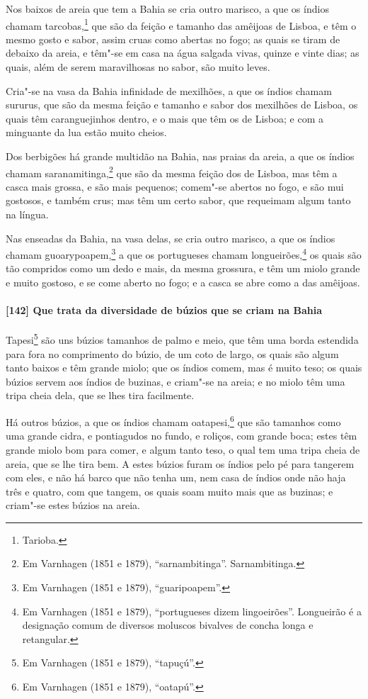 Nos baixos de areia que tem a Bahia se cria outro marisco, a que os índios chamam
tarcobas,\footnote{ Tarioba.} que são da feição e tamanho das amêijoas de Lisboa, e têm o
mesmo gosto e sabor, assim cruas como abertas no fogo; as quais se tiram de debaixo da
areia, e têm"-se em casa na água salgada vivas, quinze e vinte dias; as quais, além de
serem maravilhosas no sabor, são muito leves.

Cria"-se na vasa da Bahia infinidade de mexilhões, a que os índios chamam sururus, que são
da mesma feição e tamanho e sabor dos mexilhões de Lisboa, os quais têm caranguejinhos
dentro, e o mais que têm os de Lisboa; e com a minguante da lua estão muito cheios.

Dos berbigões há grande multidão na Bahia, nas praias da areia, a que os índios chamam
saranamitinga,\footnote{ Em Varnhagen (1851 e 1879), ``sarnambitinga''. Sarnambitinga.}
que são da mesma feição dos de Lisboa, mas têm a casca mais grossa, e são mais pequenos;
comem"-se abertos no fogo, e são mui gostosos, e também crus; mas têm um certo sabor, que
requeimam algum tanto na língua.

Nas enseadas da Bahia, na vasa delas, se cria outro marisco, a que os índios chamam
guoarypoapem,\footnote{ Em Varnhagen (1851 e 1879), ``guaripoapem''.} a que os portugueses
chamam longueirões,\footnote{ Em Varnhagen (1851 e 1879), ``portugueses dizem
lingoeirões''. Longueirão é a designação comum de diversos moluscos bivalves de concha
longa e retangular.} os quais são tão compridos como um dedo e mais, da mesma grossura, e
têm um miolo grande e muito gostoso, e se come aberto no fogo; e a casca se abre como a
das amêijoas.

\paragraph{[142] Que trata da diversidade de búzios que se criam na Bahia}\quad
Tapesi\footnote{ Em Varnhagen (1851 e 1879), ``tapuçú''.} são uns búzios tamanhos de palmo
e meio, que têm uma borda estendida para fora no comprimento do búzio, de um coto de
largo, os quais são algum tanto baixos e têm grande miolo; que os índios comem, mas é
muito teso; os quais búzios servem aos índios de buzinas, e criam"-se na areia; e no miolo
têm uma tripa cheia dela, que se lhes tira facilmente.

Há outros búzios, a que os índios chamam oatapesi,\footnote{ Em Varnhagen (1851 e 1879),
``oatapú''.} que são tamanhos como uma grande cidra, e pontiagudos no fundo, e roliços,
com grande boca; estes têm grande miolo bom para comer, e algum tanto teso, o qual tem uma
tripa cheia de areia, que se lhe tira bem. A estes búzios furam os índios pelo pé para
tangerem com eles, e não há barco que não tenha um, nem casa de índios onde não haja três
e quatro, com que tangem, os quais soam muito mais que as buzinas; e criam"-se estes búzios
na areia.

